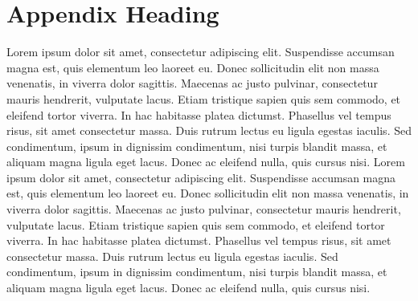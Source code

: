 \documentclass{winnower}
\begin{document}
\section{Appendix Heading}
Lorem ipsum dolor sit amet, consectetur adipiscing elit. Suspendisse accumsan magna est, quis elementum leo laoreet eu. Donec sollicitudin elit non massa venenatis, in viverra dolor sagittis. Maecenas ac justo pulvinar, consectetur mauris hendrerit, vulputate lacus. Etiam tristique sapien quis sem commodo, et eleifend tortor viverra. In hac habitasse platea dictumst. Phasellus vel tempus risus, sit amet consectetur massa. Duis rutrum lectus eu ligula egestas iaculis. Sed condimentum, ipsum in dignissim condimentum, nisi turpis blandit massa, et aliquam magna ligula eget lacus. Donec ac eleifend nulla, quis cursus nisi. Lorem ipsum dolor sit amet, consectetur adipiscing elit. Suspendisse accumsan magna est, quis elementum leo laoreet eu. Donec sollicitudin elit non massa venenatis, in viverra dolor sagittis. Maecenas ac justo pulvinar, consectetur mauris hendrerit, vulputate lacus. Etiam tristique sapien quis sem commodo, et eleifend tortor viverra. In hac habitasse platea dictumst. Phasellus vel tempus risus, sit amet consectetur massa. Duis rutrum lectus eu ligula egestas iaculis. Sed condimentum, ipsum in dignissim condimentum, nisi turpis blandit massa, et aliquam magna ligula eget lacus. Donec ac eleifend nulla, quis cursus nisi.

\fi
\end{document}

